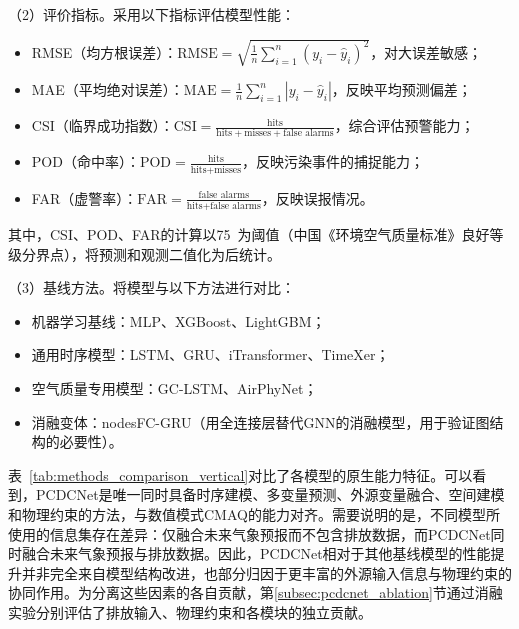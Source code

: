 （2）评价指标。采用以下指标评估模型性能\citep{evaluation}：

\begin{itemize}
    \item RMSE（均方根误差）：$\text{RMSE} = \sqrt{\frac{1}{n}\sum_{i=1}^{n}(y_i - \hat{y}_i)^2}$，对大误差敏感；
    \item MAE（平均绝对误差）：$\text{MAE} = \frac{1}{n}\sum_{i=1}^{n}|y_i - \hat{y}_i|$，反映平均预测偏差；
    \item CSI（临界成功指数）：$\text{CSI} = \frac{\text{hits}}{\text{hits} + \text{misses} + \text{false alarms}}$，综合评估预警能力；
    \item POD（命中率）：$\text{POD} = \frac{\text{hits}}{\text{hits} + \text{misses}}$，反映污染事件的捕捉能力；
    \item FAR（虚警率）：$\text{FAR} = \frac{\text{false alarms}}{\text{hits} + \text{false alarms}}$，反映误报情况。
\end{itemize}

其中，CSI、POD、FAR的计算以75~\ug{}为阈值（中国《环境空气质量标准》良好等级分界点\citep{evaluation}），将预测和观测二值化为后统计。

（3）基线方法。将模型与以下方法进行对比：

\begin{itemize}
    \item 机器学习基线：MLP、XGBoost\citep{chen2016xgboost}、LightGBM\citep{ke2017lightgbm}；
    \item 通用时序模型：LSTM\citep{hochreiter1997long}、GRU\citep{cho2014learning}、iTransformer\citep{liuitransformer}、TimeXer\citep{wang2024timexer}；
    \item 空气质量专用模型：GC-LSTM\citep{qi2019hybrid}、AirPhyNet\citep{hettigeairphynet}；
    \item 消融变体：nodesFC-GRU（用全连接层替代GNN的消融模型，用于验证图结构的必要性）。
\end{itemize}

表~\ref{tab:methods_comparison_vertical}对比了各模型的原生能力特征。可以看到，PCDCNet是唯一同时具备时序建模、多变量预测、外源变量融合、空间建模和物理约束的方法，与数值模式CMAQ的能力对齐。需要说明的是，不同模型所使用的信息集存在差异：\ModelPred{}仅融合未来气象预报而不包含排放数据，而PCDCNet同时融合未来气象预报与排放数据。因此，PCDCNet相对于其他基线模型的性能提升并非完全来自模型结构改进，也部分归因于更丰富的外源输入信息与物理约束的协同作用。为分离这些因素的各自贡献，第\ref{subsec:pcdcnet_ablation}节通过消融实验分别评估了排放输入、物理约束和各模块的独立贡献。

